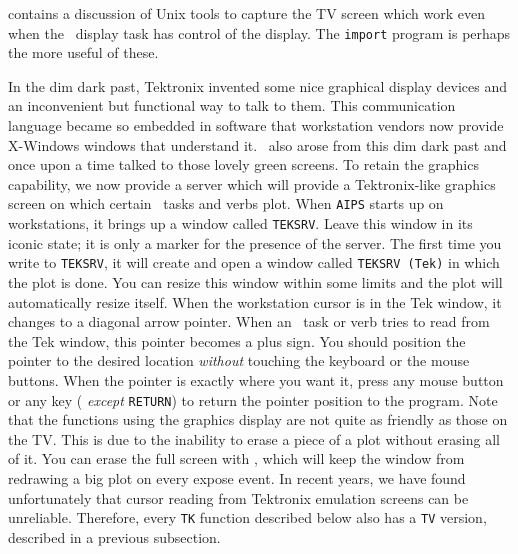  contains a discussion of Unix tools to capture the TV
screen which work even when the \AIPS\ display task has control of the
display.  The {\tt import} program is perhaps the more useful of
these.


     In the dim dark past, Tektronix invented some nice graphical
display devices and an inconvenient but functional way to talk to
them.  This communication language became so embedded in software that
workstation vendors now provide X-Windows windows that understand it.
\AIPS\ also arose from this dim dark past and once upon a time talked
to those lovely green screens.  To retain the graphics capability, we
now provide a {\tt {}} server which will provide a
Tektronix-like graphics screen on which certain \AIPS\ tasks and verbs
plot.  When {\tt AIPS} starts up on workstations, it brings up a
window called {\tt TEKSRV}\@.  Leave this window in its iconic state;
it is only a marker for the presence of the server.  The first time
you write to {\tt TEKSRV}, it will create and open a window called
{\tt TEKSRV (Tek)} in which the plot is done.  You can resize this
window within some limits and the plot will automatically resize
itself. When the workstation cursor is in the Tek window, it changes
to a diagonal arrow pointer.  When an \AIPS\ task or verb tries to
read from the Tek window, this pointer becomes a plus sign.  You
should position the pointer to the desired location {\it without\/}
touching the keyboard or the mouse buttons.  When the pointer is
exactly where you want it, press any mouse button or any key ({\it
except\/} {\tt RETURN}) to return the pointer position to the program.
Note that the functions using the graphics display are not quite as
friendly as those on the TV\@.  This is due to the inability to erase
a piece of a plot without erasing all of it.  You can erase the full
screen with {\tt {}}, which will keep the window from
redrawing a big plot on every expose event.  In recent years, we have
found unfortunately that cursor reading from Tektronix emulation
screens can be unreliable.  Therefore, every {\tt TK} function
described below also has a {\tt TV} version, described in a previous
subsection.


